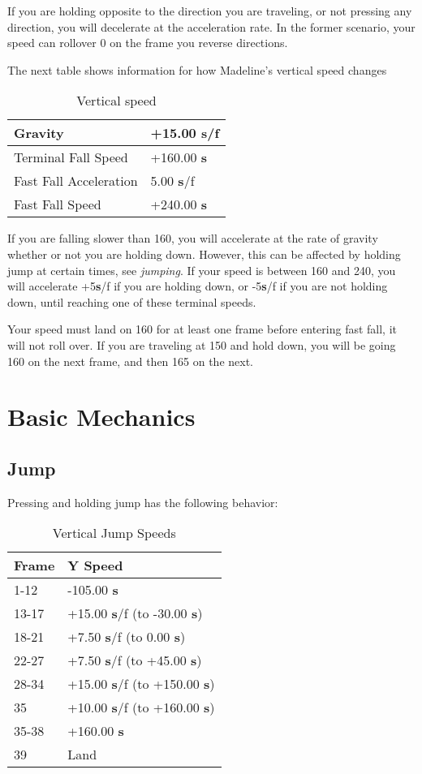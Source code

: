 \documentclass[oneside]{book}
\newcommand{\s}{\textbf{s}}
\begin{document}
If you are holding opposite to the direction you are traveling, or not pressing any direction, you will decelerate at the acceleration rate. In the former scenario, your speed can rollover 0 on the frame you reverse directions.

The next table shows information for how Madeline's vertical speed changes

\begin{table}[h]
\begin{tabular}{|l|l|}
\hline
Gravity&+15.00 \s/f\\
\hline
Terminal Fall Speed&+160.00 \s\\
\hline
Fast Fall Acceleration&5.00 \s/f\\
\hline
Fast Fall Speed&+240.00 \s\\
\hline
\end{tabular}
\caption{Vertical speed}
\end{table}

If you are falling slower than 160, you will accelerate at the rate of gravity whether or not you are holding down. However, this can be affected by holding jump at certain times, see \textit{jumping}. If your speed is between 160 and 240, you will accelerate +5\s/f if you are holding down, or -5\s/f if you are not holding down, until reaching one of these terminal speeds.

Your speed must land on 160 for at least one frame before entering fast fall, it will not roll over. If you are traveling at 150 and hold down, you will be going 160 on the next frame, and then 165 on the next.

\chapter{Basic Mechanics}

\section{Jump}

Pressing and holding jump has the following behavior:

\begin{table}[h]
\begin{tabular}{|l|l|}
\hline
Frame&Y Speed\\
\hline
1-12&-105.00 \s\\
\hline
13-17&+15.00 \s/f (to -30.00 \s)\\
\hline
18-21&+7.50 \s/f (to 0.00 \s)\\
\hline
22-27&+7.50 \s/f (to +45.00 \s)\\
\hline
28-34&+15.00 \s/f (to +150.00 \s)\\
\hline
35&+10.00 \s/f (to +160.00 \s)\\
\hline
35-38&+160.00 \s\\
\hline
39&Land\\
\hline
\end{tabular}
\caption{Vertical Jump Speeds}
\end{table}
\end{document}
